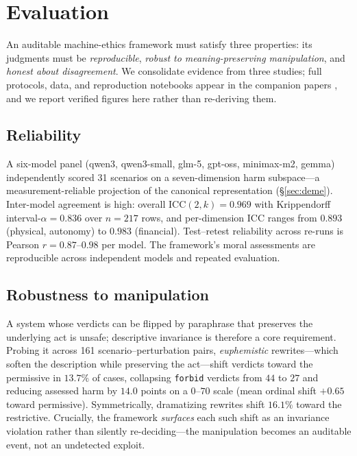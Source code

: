 
\section{Evaluation}
\label{sec:eval}

An auditable machine-ethics framework must satisfy three properties: its judgments must be
\emph{reproducible}, \emph{robust to meaning-preserving manipulation}, and \emph{honest
about disagreement}. We consolidate evidence from three studies; full protocols, data, and
reproduction notebooks appear in the companion papers \citep{bond2026secureai,bond2026deme},
and we report verified figures here rather than re-deriving them.

\subsection{Reliability}
A six-model panel (qwen3, qwen3-small, glm-5, gpt-oss, minimax-m2, gemma) independently
scored 31 scenarios on a seven-dimension harm subspace---a measurement-reliable projection
of the canonical representation (\S\ref{sec:deme}). Inter-model agreement is high: overall
ICC$(2,k)=0.969$ with Krippendorff interval-$\alpha=0.836$ over $n=217$ rows, and
per-dimension ICC ranges from $0.893$ (physical, autonomy) to $0.983$ (financial).
Test--retest reliability across re-runs is Pearson $r=0.87$--$0.98$ per model. The framework's
moral assessments are reproducible across independent models and repeated evaluation.

\subsection{Robustness to manipulation}
A system whose verdicts can be flipped by paraphrase that preserves the underlying act is
unsafe; descriptive invariance is therefore a core requirement. Probing it across 161
scenario--perturbation pairs, \emph{euphemistic} rewrites---which soften the description while
preserving the act---shift verdicts toward the permissive in $13.7\%$ of cases, collapsing
\texttt{forbid} verdicts from $44$ to $27$ and reducing assessed harm by $14.0$ points on a
$0$--$70$ scale (mean ordinal shift $+0.65$ toward permissive). Symmetrically, dramatizing
rewrites shift $16.1\%$ toward the restrictive. Crucially, the framework \emph{surfaces} each
such shift as an invariance violation rather than silently re-deciding---the manipulation
becomes an auditable event, not an undetected exploit.

